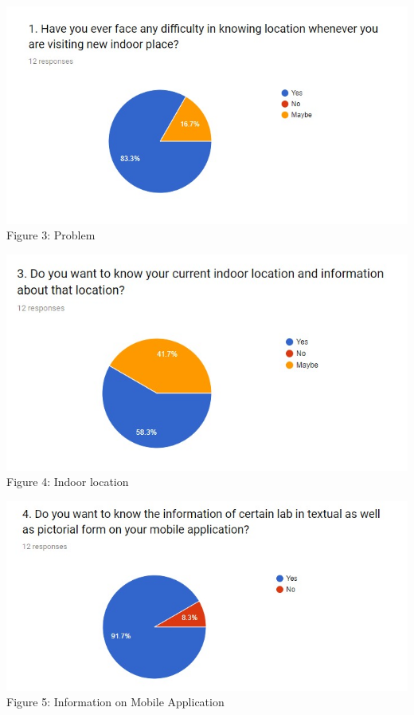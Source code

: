 \documentclass{article}
\begin{document}
\begin{center}
\includegraphics[scale=0.7]{graph1}
\\Figure 3: Problem
\end{center}


\begin{center}
\includegraphics[scale=0.7]{graph3}
\\Figure 4: Indoor location
\end{center}

\begin{center}
\includegraphics[scale=0.7]{graph4}
\\Figure 5: Information on Mobile Application
\end{center}
\end{document}
